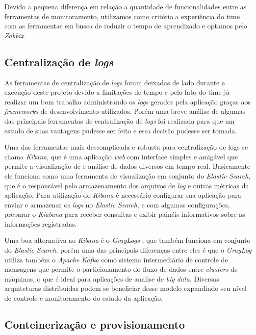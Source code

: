 \documentclass[
	12pt,				%
	openright,			%
	oneside,			%
	a4paper,			%
	english,			%
	french,				%
	spanish,			%
	brazil,				%
	]{abntex2}
\begin{document}
Devido a pequena diferença em relação a quantidade de funcionalidades entre as ferramentas de monitoramento, utilizamos como critério a experiência do time com as ferramentas em busca de reduzir o tempo de aprendizado e optamos pelo \textit{Zabbix}.

\subsection{Centralização de \textit{logs}}

As ferramentas de centralização de \textit{logs} foram deixadas de lado durante a execução deste projeto devido a limitações de tempo e pelo fato do time já realizar um bom trabalho administrando os \textit{logs} gerados pela aplicação graças aos \textit{frameworks} de desenvolvimento utilizados. Porém uma breve análise de algumas das principais ferramentas de centralização de \textit{logs} foi realizada para que um estudo de suas vantagens pudesse ser feito e essa decisão pudesse ser tomada.

Uma das ferramentas mais descomplicada e robusta para centralização de logs se chama \textit{Kibana}, que é uma aplicação \textit{web} com interface simples e amigável que permite a visualização de e análise de dados diversos em tempo real. Basicamente ele funciona como uma ferramenta de visualização em conjunto do \textit{Elastic Search}, que é o responsável pelo armazenamento dos arquivos de \textit{log} e outras métricas da aplicação. Para utilização do \textit{Kibana} é necessário configurar sua aplicação para enviar e armazenar os \textit{logs} no \textit{Elastic Search}, e com algumas configurações, preparar o \textit{Kiabana} para receber consultas e exibir painéis informativos sobre as informações registradas\cite{Kibana:Logs}.

Uma boa alternativa ao \textit{Kibana} é o \textit{GrayLogs} \cite{GrayLog:Logs}, que também funciona em conjunto do \textit{Elastic Search}, porém uma das principais diferenças entre eles é que o \textit{GrayLog} utiliza também o \textit{Apache Kafka} como sistema intermediário de controle de mensagens que permite o particionamento do fluxo de dados entre \textit{clusters} de máquinas, o que é ideal para aplicações de analise de \textit{big data}. Diversas arquiteturas distribuídas podem se beneficiar desse modelo expandindo seu nível de controle e monitoramento do estado da aplicação.

\subsection{Conteinerização e provisionamento}
\end{document}
